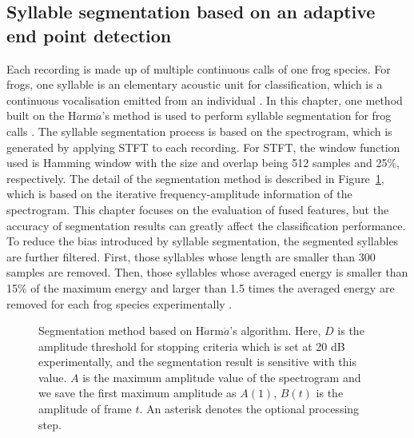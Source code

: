 \subsection{Syllable segmentation based on an adaptive end point detection}
\label{Ch3:segmentationProcess}

Each recording is made up of multiple continuous calls of one frog species. For frogs, one syllable is an elementary acoustic unit for classification, which is a continuous vocalisation emitted from an individual \citep{huang2009frog}. In this chapter, one method built on the H$\ddot{a}$rm$\ddot{a}$'s method is used to perform syllable segmentation for frog calls \citep{harma2003automatic}. The syllable segmentation process is based on the spectrogram, which is generated by applying STFT to each recording. For STFT, the window function used is Hamming window with the size and overlap being 512 samples and 25\%, respectively. The detail of the segmentation method is described in Figure~\ref{fig:segmentation}, which is based on the iterative frequency-amplitude information of the spectrogram. This chapter focuses on the evaluation of fused features, but the accuracy of segmentation results can greatly affect the classification performance. To reduce the bias introduced by syllable segmentation, the segmented syllables are further filtered. First, those syllables whose length are smaller than 300 samples are removed. Then, those syllables whose averaged energy is smaller than 15\% of the maximum energy and larger than 1.5 times the averaged energy are removed for each frog species experimentally \citep{Gingras2013}.


\begin{figure}[htb!] %
\caption[H$\ddot{a}$rm$\ddot{a}$'s segmentation algorithm]{Segmentation method based on H$\ddot{a}$rm$\ddot{a}$'s algorithm. Here, $D$ is the amplitude threshold for stopping criteria which is set at 20 dB experimentally, and the segmentation result is sensitive with this value. $A$ is the maximum amplitude value of the spectrogram and we save the first maximum amplitude as $A(1)$, $B(t)$ is the amplitude of frame $t$. An asterisk denotes the optional processing step.}
\label{fig:segmentation} 
\end{figure}



